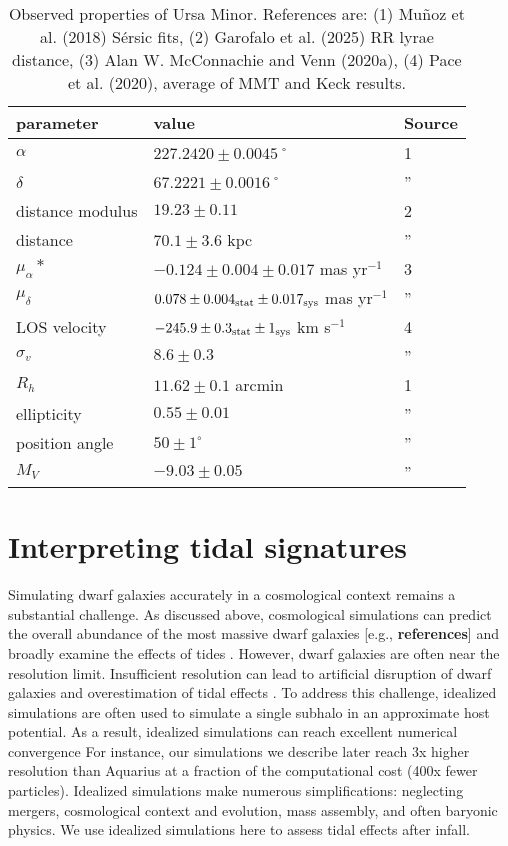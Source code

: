 \begin{table*}[t]
\centering
\caption[Observed Properties of Ursa Minor]{Observed properties of Ursa Minor. References are: (1) Muñoz et al. (2018) Sérsic fits, (2) Garofalo et al. (2025) RR lyrae distance, (3) Alan W. McConnachie and Venn (2020a), (4) Pace et al. (2020), average of MMT and Keck results. }
\label{tbl:umi_obs_props}
\begin{tabular}{lll}
\toprule
parameter & value & Source\\
\midrule
$\alpha$ & $ 227.2420 \pm 0.0045$˚ & 1\\
$\delta$ & $67.2221 \pm 0.0016$˚ & ”\\
distance modulus & $19.23 \pm 0.11$ & 2\\
distance & $70.1 \pm 3.6$ kpc & ”\\
$\mu_\alpha*$ & $-0.124 \pm 0.004 \pm 0.017$ mas yr$^{-1}$ & 3\\
$\mu_\delta$ & $0.078 \pm 0.004_{\rm stat} \pm 0.017_{\rm sys}$ mas yr$^{-1}$ & ”\\
LOS velocity & $-245.9 \pm 0.3_{\rm stat} \pm 1_{\rm sys}$ km s$^{-1}$ & 4\\
$\sigma_v$ & $8.6 \pm 0.3$ & ”\\
$R_h$ & $11.62 \pm 0.1$ arcmin & 1\\
ellipticity & $0.55 \pm 0.01$ & ”\\
position angle & $50 \pm 1^\circ$ & ”\\
$M_V$ & $-9.03 \pm 0.05$ & ”\\
\bottomrule
\end{tabular}
\end{table*}

\section{Interpreting tidal signatures}\label{sec:tidal_theory}

Simulating dwarf galaxies accurately in a cosmological context remains a
substantial challenge. As discussed above, cosmological simulations can
predict the overall abundance of the most massive dwarf galaxies
{[}e.g., \textbf{references}{]} and broadly examine the effects of tides
\citep[e.g.,][]{riley+2024}. However, dwarf galaxies are often near the
resolution limit. Insufficient resolution can lead to artificial
disruption of dwarf galaxies and overestimation of tidal effects
\citep[e.g.,][]{santos-santos+2025}. To address this challenge,
idealized simulations are often used to simulate a single subhalo in an
approximate host potential. As a result, idealized simulations can reach
excellent numerical convergence For instance, our simulations we
describe later reach 3x higher resolution than Aquarius
\citep{springel+2008} at a fraction of the computational cost (400x
fewer particles). Idealized simulations make numerous simplifications:
neglecting mergers, cosmological context and evolution, mass assembly,
and often baryonic physics. We use idealized simulations here to assess
tidal effects after infall.

